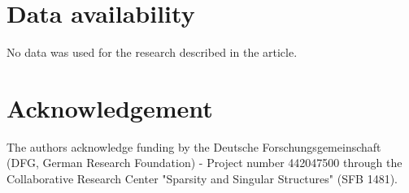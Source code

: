 \documentclass[11pt]{amsart}
\newenvironment{proof sketch} {\textit{Proof sketch.}}{}
\begin{document}
  \section*{Data availability}

  No data was used for the research described in the article.
  
  \section*{Acknowledgement}
  
  The authors acknowledge funding by the Deutsche Forschungsgemeinschaft (DFG, German Research Foundation) - Project number 442047500 through the Collaborative Research Center "Sparsity and Singular Structures" (SFB 1481).

\printbibliography
\vspace*{2em}
\end{document}
